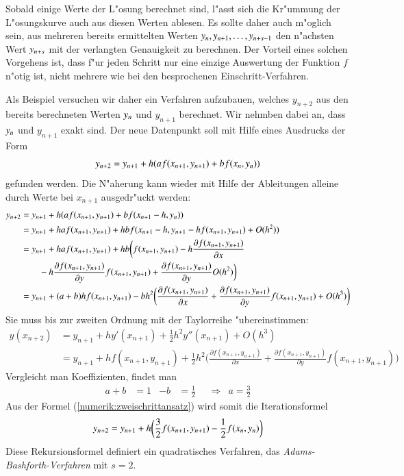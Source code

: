 Sobald einige Werte der L"osung berechnet sind, l"asst sich die Kr"ummung
der L"osungskurve auch aus diesen Werten ablesen.
Es sollte daher auch m"oglich sein, aus mehreren bereits
ermittelten Werten $y_{n\mathstrut},y_{n+1},\dots,y_{n+s-1}$
den n"achsten Wert $y_{n+s\mathstrut}$ mit der verlangten Genauigkeit
zu berechnen.
Der Vorteil eines solchen Vorgehens ist, dass f"ur jeden Schritt nur 
eine einzige Auswertung der Funktion $f$ n"otig ist,
nicht mehrere wie bei den besprochenen Einschritt-Verfahren.

Als Beispiel versuchen wir daher ein Verfahren aufzubauen, welches
$y_{n+2}$ aus den bereits berechneten Werten $y_{n\mathstrut}$ und
$y_{n+1}$ berechnet.
Wir nehmben dabei an, dass $y_{n\mathstrut}$ und $y_{n+1}$ exakt
sind.
Der neue Datenpunkt soll mit Hilfe eines Ausdrucks der Form
\begin{equation}
y_{n+2}=y_{n+1} + h(af(x_{n+1},y_{n+1}) + b f(x_{n\mathstrut},y_{n\mathstrut}))
\label{numerik:zweischrittansatz}
\end{equation}
gefunden werden.
Die N"aherung kann wieder mit Hilfe der Ableitungen alleine
durch Werte bei $x_{n+1}$ ausgedr"uckt werden:
\begin{align*}
y_{n+2}
&=
y_{n+1}+h(af(x_{n+1}, y_{n+1}) + bf(x_{n+1}-h, y_{n\mathstrut}))
\\
&=
y_{n+1}+haf(x_{n+1}, y_{n+1}) + hbf(x_{n+1}-h, y_{n+1} - h f(x_{n+1},y_{n+1}) + O(h^2))
\\
&=
y_{n+1}+haf(x_{n+1}, y_{n+1}) + hb
\biggl(
f(x_{n+1},y_{n+1})
-h \frac{\partial f(x_{n+1},y_{n+1})}{\partial x}
\\
&\qquad
-h
\frac{\partial f(x_{n+1},y_{n+1})}{\partial y}
f(x_{n+1},y_{n+1})
+ 
\frac{\partial f(x_{n+1},y_{n+1})}{\partial y}
O(h^2)
\biggr)
\\
&=
y_{n+1}
+ (a+b)hf(x_{n+1},y_{n+1})
- bh^2\biggl(
\frac{\partial f(x_{n+1},y_{n+1})}{\partial x}
+
\frac{\partial f(x_{n+1},y_{n+1})}{\partial y}
f(x_{n+1},y_{n+1})
+O(h^3)
\biggr)
\end{align*}
Sie muss bis zur zweiten Ordnung mit der Taylorreihe "ubereinstimmen:
\begin{align*}
y(x_{n+2})
&=
y_{n+1} + hy'(x_{n+1}) + \frac12h^2 y''(x_{n+1})+O(h^3)
\\
&=
y_{n+1}+hf(x_{n+1},y_{n+1})+\frac12h^2\biggl(
\frac{\partial f(x_{n+1},y_{n+1})}{\partial x}
+
\frac{\partial f(x_{n+1},y_{n+1})}{\partial y}
f(x_{n+1},y_{n+1})
\biggr)
\end{align*}
Vergleicht man Koeffizienten, findet man
\[
\begin{aligned}
a+b&=1&-b&=\frac12&&\Rightarrow&a=\frac32
\end{aligned}
\]
Aus der Formel (\ref{numerik:zweischrittansatz}) wird somit die
Iterationsformel
\begin{equation}
y_{n+2}=y_{n+1}+h\biggl(\frac32f(x_{n+1},y_{n+1})
- \frac12 f(x_{n\mathstrut},y_{n\mathstrut})\biggr)
\end{equation}
Diese Rekursionsformel definiert ein quadratisches Verfahren, das
{\em Adams-Bashforth-Verfahren} mit $s=2$.

